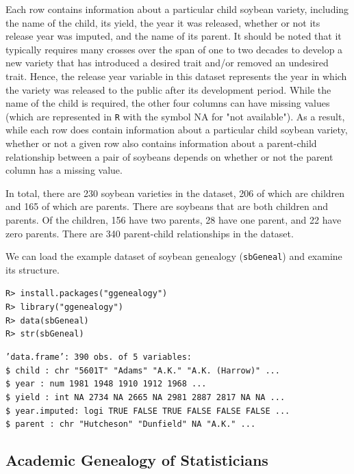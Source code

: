 \documentclass[11pt,a4paper,oldfontcommands,openany]{memoir}
\DeclareRobustCommand{\mybox}[2][gray!15]{%
\begin{tcolorbox}[   %
        breakable,
        left=0pt,
        right=0pt,
        top=0pt,
        bottom=0pt,
        colback=#1,
        colframe=#1,
        width=\dimexpr\textwidth\relax, 
        enlarge left by=0mm,
        boxsep=5pt,
        arc=0pt,outer arc=0pt,
        ]
        #2
\end{tcolorbox}
}
\numberwithin{equation}{section} %
\newcommand{\code}[1]{{\texttt{#1}}}
\newcommand{\pkg}[1]{{\texttt{#1}}}
\begin{document}
Each row contains information about a particular child soybean variety, including the name of the child, its yield, the year it was released, whether or not its release year was imputed, and the name of its parent. It should be noted that it typically requires many crosses over the span of one to two decades to develop a new variety that has introduced a desired trait and/or removed an undesired trait. Hence, the release year variable in this dataset represents the year in which the variety was released to the public after its development period. While the name of the child is required, the other four columns can have missing values (which are represented in \pkg{R} with the symbol NA for "not available"). As a result, while each row does contain information about a particular child soybean variety, whether or not a given row also contains information about a parent-child relationship between a pair of soybeans depends on whether or not the parent column has a missing value.

In total, there are 230 soybean varieties in the dataset, 206 of which are children and 165 of which are parents. There are soybeans that are both children and parents. Of the children, 156 have two parents, 28 have one parent, and 22 have zero parents. There are 340 parent-child relationships in the dataset.

We can load the example dataset of soybean genealogy (\code{sbGeneal}) and examine its structure. 

\mybox{
\texttt{R> install.packages("ggenealogy")}\\
\texttt{R> library("ggenealogy")}\\
\texttt{R> data(sbGeneal)}\\
\texttt{R> str(sbGeneal)}
}

\mybox[green!10]{
\texttt{'data.frame':	390 obs. of  5 variables:}\\
\texttt{\$ child       : chr  "5601T" "Adams" "A.K." "A.K. (Harrow)" ...}\\
\texttt{\$ year        : num  1981 1948 1910 1912 1968 ...}\\
\texttt{\$ yield       : int  NA 2734 NA 2665 NA 2981 2887 2817 NA NA ...}\\
\texttt{\$ year.imputed: logi  TRUE FALSE TRUE FALSE FALSE FALSE ...}\\
\texttt{\$ parent      : chr  "Hutcheson" "Dunfield" NA "A.K." ...}
}

\subsection{Academic Genealogy of Statisticians}
\end{document}

